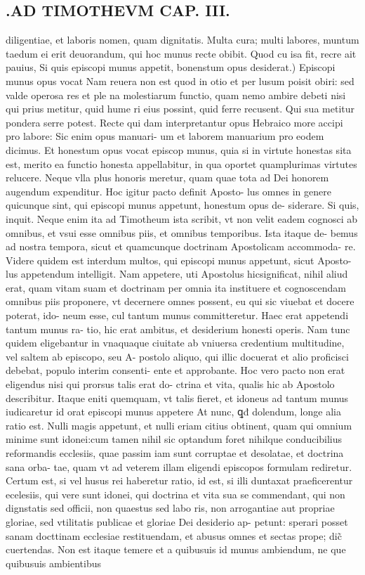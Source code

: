 \documentclass{article}
\begin{document}
\begin{pages}
\section*{.AD TIMOTHEVM CAP. III. }
\marginpar{[ p.75 ]}\pstart diligentiae, et laboris nomen, quam dignitatis. Multa cura; multi labores, muntum taedum ei erit deuorandum, qui hoc munus recte obibit. Quod cu isa fit, recre ait pauius, Si quis episcopi munus appetit, bonenstum opus desiderat.) Episcopi munus opus vocat  \pend\pstart Nam reuera non est quod in otio et per lusum poisit obiri: sed valde operosa res et ple na molestiarum functio, quam nemo ambire debeti nisi qui prius metitur, quid hume ri eius possint, quid ferre recusent. Qui sua metitur pondera serre potest. Recte qui dam interpretantur opus Hebraico more accipi pro labore: Sic enim opus manuari- um et laborem manuarium pro eodem dicimus. Et honestum opus vocat episcop munus, quia si in virtute honestas sita est, merito ea functio honesta appellabitur, in qua oportet quamplurimas virtutes relucere. Neque vlla plus honoris meretur, quam quae tota ad Dei honorem augendum expenditur. Hoc igitur pacto definit Aposto- lus omnes in genere quicunque sint, qui episcopi munus appetunt, honestum opus de- siderare. Si quis, inquit. Neque enim ita ad Timotheum ista scribit, vt non velit eadem cognosci ab omnibus, et vsui esse omnibus piis, et omnibus temporibus. Ista itaque de- bemus ad nostra tempora, sicut et quamcunque doctrinam Apostolicam accommoda- re. Videre quidem est interdum multos, qui episcopi munus appetunt, sicut Aposto- lus appetendum intelligit. Nam appetere, uti Apostolus hicsignificat, nihil aliud erat, quam vitam suam et doctrinam per omnia ita instituere et cognoscendam omnibus piis proponere, vt decernere omnes possent, eu qui sic viuebat et docere poterat, ido- neum esse, cul tantum munus committeretur. Haec erat appetendi tantum munus ra- tio, hic erat ambitus, et desiderium honesti operis. Nam tunc quidem eligebantur in vnaquaque ciuitate ab vniuersa credentium multitudine, vel saltem ab episcopo, seu A- postolo aliquo, qui illic docuerat et alio proficisci debebat, populo interim consenti- ente et approbante. Hoc vero pacto non erat eligendus nisi qui prorsus talis erat do- ctrina et vita, qualis hic ab Apostolo describitur. Itaque eniti quemquam, vt talis fieret, et idoneus ad tantum munus iudicaretur id orat episcopi munus appetere At nunc, ꝗđ dolendum, longe alia ratio est. Nulli magis appetunt, et nulli eriam citius obtinent, quam qui omnium minime sunt idonei:cum tamen nihil sic optandum foret nihilque conducibilius reformandis ecclesiis, quae passim iam sunt corruptae et desolatae, et doctrina sana orba- tae, quam vt ad veterem illam eligendi episcopos formulam rediretur. Certum est, si vel husus rei haberetur ratio, id est, si illi duntaxat praeficerentur ecelesiis, qui vere sunt idonei, qui doctrina et vita sua se commendant, qui non dignstatis sed officii, non quaestus sed labo ris, non arrogantiae aut propriae gloriae, sed vtilitatis publicae et gloriae Dei desiderio ap- petunt: sperari posset sanam docttinam ecclesiae restituendam, et abusus omnes et sectas prope; dic̃ cuertendas. Non est itaque temere et a quibusuis id munus ambiendum, ne que quibusuis ambientibus 
\end{pages}
\end{document}
